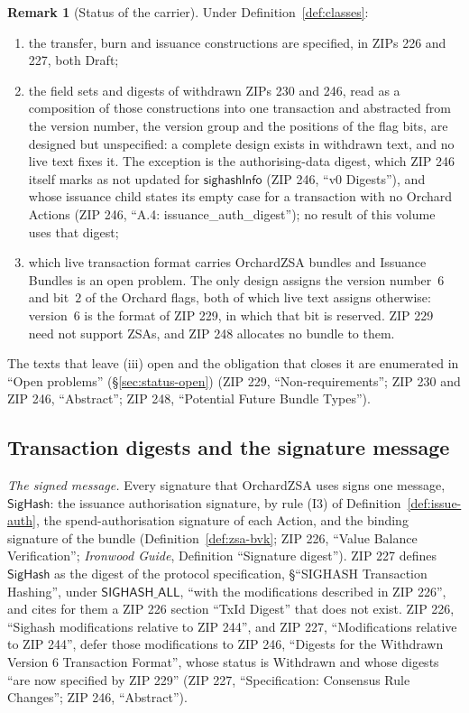 \documentclass[11pt,a4paper]{article}
\theoremstyle{definition}
\newtheorem{remark}[theorem]{Remark}
\begin{document}
\begin{remark}[Status of the carrier]\label{rem:carrier-status}
Under Definition~\ref{def:classes}:
\begin{enumerate}[label=(\roman*)]
\item the transfer, burn and issuance constructions are specified, in ZIPs
  226 and 227, both Draft;
\item the field sets and digests of withdrawn ZIPs 230 and 246, read as a
  composition of those constructions into one transaction and abstracted
  from the version number, the version group and the positions of the
  flag bits, are designed but unspecified: a complete design exists in
  withdrawn text, and no live text fixes it. The exception is the
  authorising-data digest, which ZIP 246 itself marks as not updated for
  $\mathsf{sighashInfo}$ (ZIP 246, ``v0 Digests''), and whose issuance
  child states its empty case for a transaction with no Orchard Actions
  (ZIP 246, ``A.4: issuance\_auth\_digest''); no result of this volume
  uses that digest;
\item which live transaction format carries OrchardZSA bundles and
  Issuance Bundles is an open problem. The only design assigns the version
  number~$6$ and bit~$2$ of the Orchard flags, both of which live text
  assigns otherwise: version~$6$ is the format of ZIP 229, in which that
  bit is reserved. ZIP 229 need not support ZSAs, and ZIP 248 allocates no
  bundle to them.
\end{enumerate}
The texts that leave (iii) open and the obligation that closes it are
enumerated in ``Open problems'' (\S\ref{sec:status-open}) (ZIP 229,
``Non-requirements''; ZIP 230 and ZIP 246, ``Abstract''; ZIP 248,
``Potential Future Bundle Types'').
\end{remark}

\subsection{Transaction digests and the signature message}
\label{sec:carrier-digest}

\emph{The signed message.} Every signature that OrchardZSA uses signs one
message, $\mathsf{SigHash}$: the issuance authorisation signature, by rule
(I3) of Definition~\ref{def:issue-auth}, the spend-authorisation signature
of each Action, and the binding signature of the bundle
(Definition~\ref{def:zsa-bvk}; ZIP 226, ``Value Balance Verification'';
\emph{Ironwood Guide}, Definition ``Signature digest''). ZIP 227 defines
$\mathsf{SigHash}$ as the digest of the protocol specification,
\S``SIGHASH Transaction Hashing'', under $\mathsf{SIGHASH\_ALL}$, ``with the
modifications described in ZIP 226'', and cites for them a ZIP 226 section
``TxId Digest'' that does not exist. ZIP 226, ``Sighash modifications
relative to ZIP 244'', and ZIP 227, ``Modifications relative to ZIP 244'',
defer those modifications to ZIP 246, ``Digests for the Withdrawn Version 6
Transaction Format'', whose status is Withdrawn and whose digests ``are now
specified by ZIP 229'' (ZIP 227, ``Specification: Consensus Rule
Changes''; ZIP 246, ``Abstract'').
\end{document}
